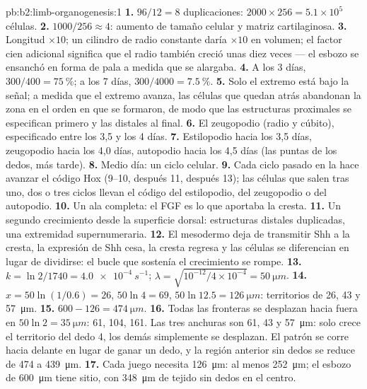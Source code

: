 \begin{solution}{pb:b2:limb-organogenesis:1}
\textbf{1.} $96/12 = 8$ duplicaciones: $2000\times 256 = 5.1\times 10^{5}$
células.
\textbf{2.} $1000/256 \approx 4$: aumento de tamaño celular y matriz
cartilaginosa.
\textbf{3.} Longitud $\times 10$; un cilindro de radio constante daría
$\times 10$ en volumen; el factor cien adicional significa que el radio
también creció unas diez veces --- el esbozo se ensanchó en forma de pala
a medida que se alargaba.
\textbf{4.} A los 3 días, $300/400 = \qty{75}{\%}$; a los 7 días, $300/4000 =
\qty{7.5}{\%}$.
\textbf{5.} Solo el extremo está bajo la señal; a medida que el extremo
avanza, las células que quedan atrás abandonan la zona en el orden en que
se formaron, de modo que las estructuras proximales se especifican
primero y las distales al final.
\textbf{6.} El zeugopodio (radio y cúbito), especificado entre los 3,5 y
los 4 días.
\textbf{7.} Estilopodio hacia los 3,5 días, zeugopodio hacia los 4,0 días,
autopodio hacia los 4,5 días (las puntas de los dedos, más tarde).
\textbf{8.} Medio día: un ciclo celular.
\textbf{9.} Cada ciclo pasado en la  hace avanzar el
código Hox (9--10, después 11, después 13); las células que salen tras
uno, dos o tres ciclos llevan el código del estilopodio, del zeugopodio o
del autopodio.
\textbf{10.} Un ala completa: el FGF es lo que aportaba la cresta.
\textbf{11.} Un segundo crecimiento desde la superficie dorsal:
estructuras distales duplicadas, una extremidad supernumeraria.
\textbf{12.} El mesodermo deja de transmitir Shh a la cresta, la
expresión de Shh cesa, la cresta regresa y las células se diferencian en
lugar de dividirse: el bucle que sostenía el crecimiento se rompe.
\textbf{13.} $k = \ln 2/1740 = \qty{4.0e-4}{s^{-1}}$; $\lambda =
\sqrt{10^{-12}/4\times 10^{-4}} = \qty{50}{\micro m}$.
\textbf{14.} $x = 50\ln(1/0.6) = 26$, $50\ln 4 = 69$, $50\ln 12.5 =
\qty{126}{\micro m}$: territorios de 26, 43 y \qty{57}{\micro m}.
\textbf{15.} $600 - 126 = \qty{474}{\micro m}$.
\textbf{16.} Todas las fronteras se desplazan hacia fuera en
$50\ln 2 = \qty{35}{\micro
m}$: 61, 104, 161. Las tres anchuras son 61, 43 y \qty{57}{\micro m}:
solo crece el territorio del dedo 4, los demás simplemente se desplazan.
El patrón se corre hacia delante en lugar de ganar un dedo, y la región
anterior sin dedos se reduce de 474 a \qty{439}{\micro m}.
\textbf{17.} Cada juego necesita \qty{126}{\micro m}: al menos
\qty{252}{\micro m}; el esbozo de \qty{600}{\micro m} tiene sitio, con
\qty{348}{\micro m} de tejido sin dedos en el centro.

\end{solution}

